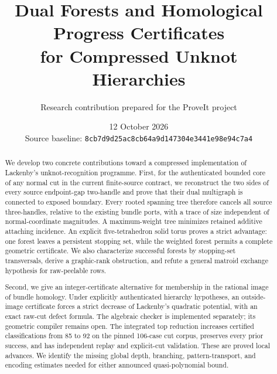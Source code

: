 \documentclass[11pt,a4paper]{article}
\title{\color{ink}\LARGE\bfseries Dual Forests and Homological Progress Certificates\\[4pt]
\Large for Compressed Unknot Hierarchies}
\author{Research contribution prepared for the ProveIt project}
\date{12 October 2026\\[5pt]\small Source baseline: \texttt{8cb7d9d25ac8cb64a9d147304e3441e98e94c7a4}}
\theoremstyle{definition}
\theoremstyle{remark}
\begin{document}
\maketitle
\begin{abstract}
We develop two concrete contributions toward a compressed implementation of
Lackenby's unknot-recognition programme. First, for the authenticated bounded
core of any normal cut in the current finite-source contract, we reconstruct
the two sides of every source endpoint-gap two-handle and prove that their
dual multigraph is connected to exposed boundary. Every rooted spanning tree
therefore cancels all source three-handles, relative to the existing bundle
ports, with a trace of size independent of normal-coordinate magnitudes.
A maximum-weight tree minimizes retained additive attaching incidence. An
explicit five-tetrahedron solid torus proves a strict advantage: one forest
leaves a persistent stopping set, while the weighted forest permits a complete
geometric certificate. We also characterize successful forests by stopping-set
transversals, derive a graphic-rank obstruction, and refute a general matroid
exchange hypothesis for raw-peelable rows.

Second, we give an integer-certificate alternative for membership in the
rational image of bundle homology. Under explicitly authenticated hierarchy
hypotheses, an outside-image certificate forces a strict decrease of Lackenby's
quadratic potential, with an exact raw-cut defect formula. The algebraic
checker is implemented separately; its geometric compiler remains open.
The integrated top reduction increases certified classifications from 85 to
92 on the pinned 106-case cut corpus, preserves every prior success, and has
independent replay and explicit-cut validation. These are proved local
advances. We identify the missing global depth, branching, pattern-transport,
and encoding estimates needed for either announced quasi-polynomial bound.
\end{abstract}

\begingroup
\small
\setlength{\parskip}{0pt}
\tableofcontents
\endgroup
\clearpage








\appendix



{\raggedright}
\end{document}
